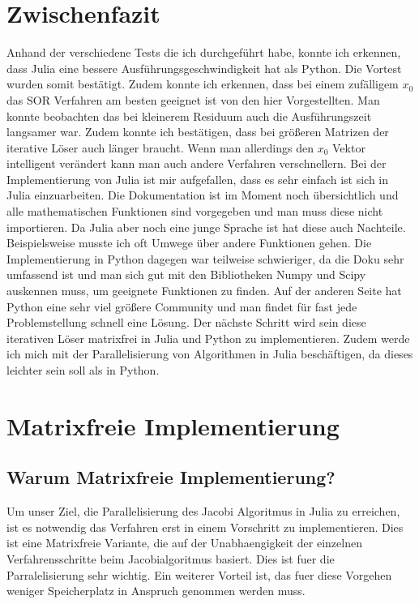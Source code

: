 \documentclass[a4paper, 11pt]{article}
\begin{document}
\section{Zwischenfazit}
Anhand der verschiedene Tests die ich durchgef\"uhrt habe, konnte ich erkennen, dass Julia eine bessere Ausf\"uhrungsgeschwindigkeit hat als Python. Die Vortest wurden somit best\"atigt. 
Zudem konnte ich erkennen, dass bei einem zuf\"alligem \(x_{0}\) das SOR Verfahren am besten geeignet ist von den hier Vorgestellten. 
Man konnte beobachten das bei kleinerem Residuum auch die Ausf\"uhrungszeit langsamer war. Zudem konnte ich best\"atigen, dass bei gr\"o\ss{}eren Matrizen der iterative L\"oser auch l\"anger braucht. 
Wenn man allerdings den \(x_{0}\) Vektor intelligent ver\"andert kann man auch andere Verfahren verschnellern. 
Bei der Implementierung von Julia ist mir aufgefallen, dass es sehr einfach ist sich in Julia einzuarbeiten. Die Dokumentation ist im Moment noch \"ubersichtlich und alle mathematischen Funktionen sind vorgegeben 
und man muss diese nicht importieren. Da Julia aber noch eine junge Sprache ist hat diese auch Nachteile. Beispielsweise musste ich oft Umwege \"uber andere Funktionen gehen.
Die Implementierung in Python dagegen war teilweise schwieriger, da die Doku sehr umfassend ist und man sich gut mit den Bibliotheken Numpy und Scipy auskennen muss, um geeignete Funktionen zu finden. 
Auf der anderen Seite hat Python eine sehr viel gr\"o\ss{}ere Community und man findet f\"ur fast jede Problemstellung schnell eine L\"osung. 
Der n\"achste Schritt wird sein diese iterativen L\"oser matrixfrei in Julia und Python zu implementieren. Zudem werde ich mich mit der Parallelisierung von Algorithmen in Julia besch\"aftigen, da dieses leichter sein soll als in Python.

\newpage

\section{Matrixfreie Implementierung }
\subsection{Warum Matrixfreie Implementierung?}
Um unser Ziel, die Parallelisierung des Jacobi Algoritmus in Julia zu erreichen, ist es notwendig das Verfahren erst in einem Vorschritt zu implementieren. Dies ist eine Matrixfreie Variante, die auf der Unabhaengigkeit 
der einzelnen Verfahrensschritte beim Jacobialgoritmus basiert. Dies ist fuer die Parralelisierung sehr wichtig. Ein weiterer Vorteil ist, das fuer diese Vorgehen weniger Speicherplatz in Anspruch genommen werden muss.
\end{document}
